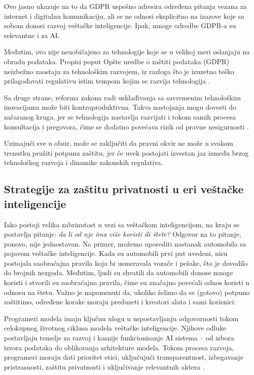 \documentclass[a4paper,12pt]{article}
\begin{document}
Ovo jasno ukazuje na to da GDPR uspešno adresira određena pitanja vezana za internet i digitalnu komunikaciju, ali se ne odnosi eksplicitno na izazove koje sa sobom donosi razvoj veštačke inteligencije. Ipak, mnoge odredbe GDPR-a su relevantne i za AI.

Međutim, ovo nije neuobičajeno za tehnologije koje se u velikoj meri oslanjaju na obradu podataka. Propisi poput Opšte uredbe o zaštiti podataka (GDPR) neizbežno zaostaju za tehnološkim razvojem, iz razloga što je izuzetno teško prilagođavati regulativu istim tempom kojim se razvija tehnologija \cite{mitrou_gdpr_ai_2018}.

Sa druge strane, reforma zakona radi usklađivanja sa savremenim tehnološkim inovacijama može biti kontraproduktivna. Takva nastojanja mogu dovesti do začaranog kruga, jer se tehnologija nastavlja razvijati i tokom samih procesa konsultacija i pregovora, čime se dodatno povećava rizik od pravne nesigurnosti \cite{mitrou_gdpr_ai_2018}.

Uzimajući sve u obzir, može se zaključiti da pravni okvir ne može u svakom trenutku pružiti potpunu zaštitu, jer će uvek postojati izvestan jaz između brzog tehnološkog razvoja i dinamike zakonskih regulativa.

\subsection{Strategije za zaštitu privatnosti u eri veštačke inteligencije}

Iako postoji velika zabrinutost u vezi sa veštačkom inteligencijom, na kraju se postavlja pitanje: \textit{da li od nje ima više koristi ili štete?} Odgovor na to pitanje, ponovo, nije jednostavan. Na primer, možemo uporediti nastanak automobila sa pojavom veštačke inteligencije. Kada su automobili prvi put uvedeni, nisu postojala saobraćajna pravila koja bi usmeravala vozače i pešake, što je dovodilo do brojnih nezgoda. Međutim, ljudi su shvatili da automobili donose mnoge koristi i stvorili su saobraćajna pravila, čime su značajno povećali odnos koristi u odnosu na štetu.
Važno je napomenuti da, ukoliko želimo da se (gotovo) potpuno zaštitimo, određene korake moraju preduzeti i kreatori alata i sami korisnici.

Programeri modela imaju ključnu ulogu u uspostavljanju odgovornosti tokom celokupnog životnog ciklusa modela veštačke inteligencije. Njihove odluke postavljaju temelje za razvoj i kasnije funkcionisanje AI sistema – od izbora izvora podataka do oblikovanja arhitekture modela. Tokom procesa razvoja, programeri moraju dati prioritet etici, uključujući transparentnost, izbegavanje pristrasnosti, zaštitu privatnosti i uključivanje relevantnih aktera
\cite{radanliev2023ethicsresponsibleaideployment}.
\end{document}
